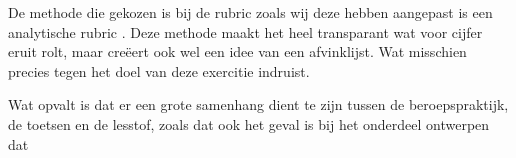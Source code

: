 De methode die gekozen is bij de rubric zoals wij deze hebben aangepast is een analytische rubric \cite[p.39]{syllabushan}. Deze methode maakt het heel transparant wat voor cijfer eruit rolt, maar creëert ook wel een idee van een afvinklijst. Wat misschien precies tegen het doel van deze exercitie indruist.

Wat opvalt is dat er een grote samenhang dient te zijn tussen de beroepspraktijk, de toetsen en de lesstof, zoals dat ook het geval is bij het onderdeel ontwerpen dat